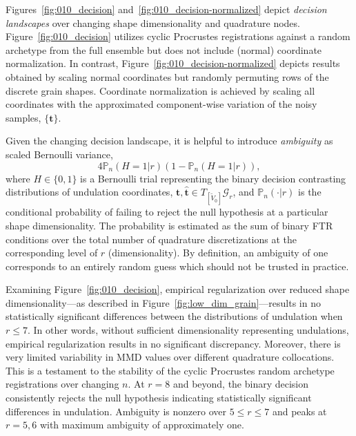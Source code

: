 \documentclass[pdflatex,iicol]{sn-jnl}%
\theoremstyle{thmstyleone}%
\theoremstyle{thmstyletwo}%
\theoremstyle{thmstylethree}%
\begin{document}
Figures~\ref{fig:010_decision} and~\ref{fig:010_decision-normalized} depict \textit{decision landscapes} over changing shape dimensionality and quadrature nodes. Figure~\ref{fig:010_decision} utilizes cyclic Procrustes registrations against a random archetype from the full ensemble but does not include (normal) coordinate normalization. In contrast, Figure~\ref{fig:010_decision-normalized} depicts results obtained by scaling normal coordinates but randomly permuting rows of the discrete grain shapes. Coordinate normalization is achieved by scaling all coordinates with the approximated component-wise variation of the noisy samples, $\lbrace \boldsymbol{t}\rbrace$. 

Given the changing decision landscape, it is helpful to introduce \textit{ambiguity} as scaled Bernoulli variance,
\begin{equation}\label{eq:ambiguity}
    4 \mathbb{P}_n( H = 1 \vert r)(1 - \mathbb{P}_n( H = 1 \vert r)),
\end{equation}
where $H \in \lbrace 0, 1\rbrace$ is a Bernoulli trial representing the binary decision contrasting distributions of undulation coordinates, $\boldsymbol{t},\widehat{\boldsymbol{t}} \in T_{[\widetilde{V}_0]}\mathcal{G}_r$, and $\mathbb{P}_n(\cdot \vert r)$ is the conditional probability of failing to reject the null hypothesis at a particular shape dimensionality. The probability is estimated as the sum of binary FTR conditions over the total number of quadrature discretizations at the corresponding level of $r$ (dimensionality). By definition, an ambiguity of one corresponds to an entirely random guess which should not be trusted in practice.

Examining Figure~\ref{fig:010_decision}, empirical regularization over reduced shape dimensionality---as described in Figure~\ref{fig:low_dim_grain}---results in no statistically significant differences between the distributions of undulation when $r \leq 7$. In other words, without sufficient dimensionality representing undulations, empirical regularization results in no significant discrepancy. Moreover, there is very limited variability in MMD values over different quadrature collocations. This is a testament to the stability of the cyclic Procrustes random archetype registrations over changing $n$. At $r=8$ and beyond, the binary decision consistently rejects the null hypothesis indicating statistically significant differences in undulation. Ambiguity is nonzero over $5\leq r\leq 7$ and peaks at $r=5,6$ with maximum ambiguity of approximately one.
\end{document}
